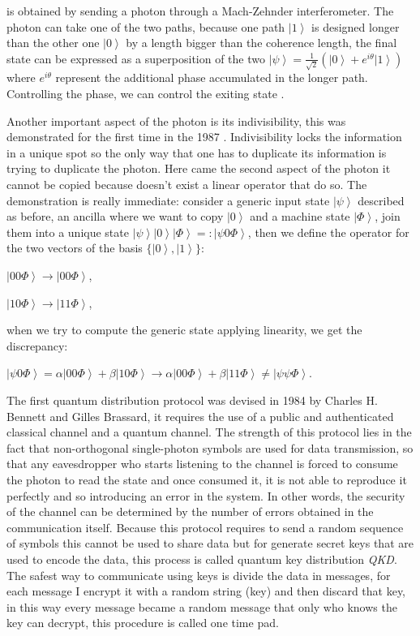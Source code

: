  is obtained by sending a photon through a Mach-Zehnder interferometer. The photon can take one of the two paths, because one path $\left|1\right>$ is designed longer than the other one $\left|0\right>$ by a length bigger than the coherence length, the final state can be expressed as a superposition of the two $\left|\psi\right> = \frac{1}{\sqrt{2}} (\left|0\right> + e^{i\theta}\left|1\right>)$ where $e^{i \theta}$ represent the additional phase accumulated in the longer path. Controlling the phase, we can control the exiting state \cite{a22}.

Another important aspect of the photon is its indivisibility, this was demonstrated for the first time in the 1987 \cite{a23}. Indivisibility locks the information in a unique spot so the only way that one has to duplicate its information is trying to duplicate the photon. Here came the second aspect of the photon it cannot be copied because doesn't exist a linear operator that do so. The demonstration is really immediate: consider a generic input state $\left|\psi\right>$ described as before, an ancilla where we want to copy $\left|0\right>$ and a machine state $\left|\Phi\right>$, join them into a unique state $\left|\psi\right>\left|0\right>\left|\Phi\right> =: \left|\psi 0 \Phi\right>$, then we define the operator for the two vectors of the basis $\{\left|0\right>, \left|1\right>\}$:

$\left|0 0 \Phi\right> \to \left|0 0 \Phi\right>$,

$\left|1 0 \Phi\right> \to \left|1 1 \Phi\right>$,

when we try to compute the generic state applying linearity, we get the discrepancy:

$\left|\psi 0 \Phi\right> = \alpha\left|0 0 \Phi\right> + \beta\left|1 0 \Phi\right> \to \alpha\left|0 0 \Phi\right> + \beta\left|1 1 \Phi\right> \ne \left|\psi \psi \Phi\right>$.



The first quantum distribution protocol  \cite{a9} was devised in 1984 by Charles H. Bennett and Gilles Brassard, it requires the use of a public and authenticated classical channel and a quantum channel. The strength of this protocol lies in the fact that non-orthogonal single-photon symbols are used for data transmission, so that any eavesdropper who starts listening to the channel is forced to consume the photon to read the state and once consumed it, it is not able to reproduce it perfectly and so introducing an error in the system. In other words, the security of the channel can be determined by the number of errors obtained in the communication itself.  Because this protocol requires to send a random sequence of symbols this cannot be used to share data but for generate secret keys that are used to encode the data, this process is called quantum key distribution \textit{QKD}. The safest way to communicate using keys is divide the data in messages, for each message I encrypt it with a random string (key) and then discard that key, in this way every message became a random message that only who knows the key can decrypt, this procedure is called one time pad.

